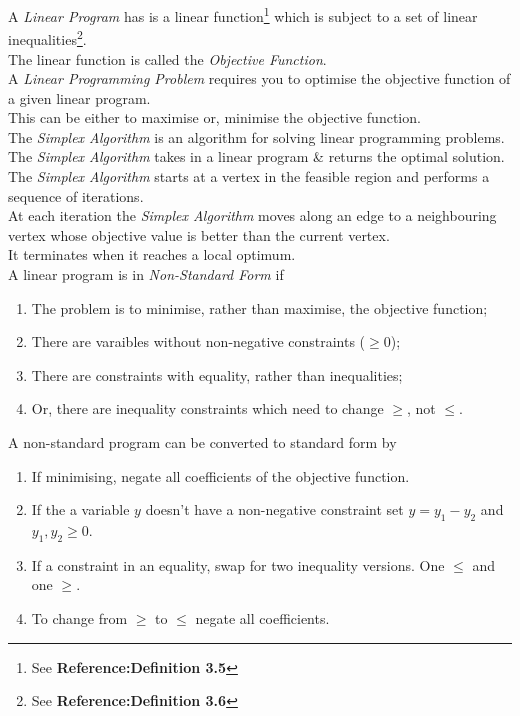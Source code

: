 \documentclass[11pt,a4paper]{article}
\begin{document}
A \textit{Linear Program} has is a linear function\footnote{See \textbf{Reference:Definition 3.5}} which is subject to a set of linear inequalities\footnote{See \textbf{Reference:Definition 3.6}}.\\
\nb The linear function is called the \textit{Objective Function}.\\

A \textit{Linear Programming Problem} requires you to optimise the objective function of a given linear program.\\
This can be either to maximise or, minimise the objective function.\\

The \textit{Simplex Algorithm} is an algorithm for solving linear programming problems.\\
The \textit{Simplex Algorithm} takes in a linear program \& returns the optimal solution.\\
The \textit{Simplex Algorithm} starts at a vertex in the feasible region and performs a sequence of iterations.\\
At each iteration the \textit{Simplex Algorithm} moves along an edge to a neighbouring vertex whose objective value is better than the current vertex.\\
It terminates when it reaches a local optimum.\\

A linear program is in \textit{Non-Standard Form} if
\begin{enumerate}[label=\roman*)]
  \item The problem is to minimise, rather than maximise, the objective function;
  \item There are varaibles without non-negative constraints ($\geq0$);
  \item There are constraints with equality, rather than inequalities;
  \item Or, there are inequality constraints which need to change $\geq$, not $\leq$.
\end{enumerate}

A non-standard program can be converted to standard form by
\begin{enumerate}[label=\roman*)]
  \item If minimising, negate all coefficients of the objective function.
  \item If the a variable $y$ doesn't have a non-negative constraint set $y=y_1-y_2$ and $y_1,y_2\geq0$.
  \item If a constraint in an equality, swap for two inequality versions. One $\leq$ and one $\geq$.
  \item To change from $\geq$ to $\leq$ negate all coefficients.
\end{enumerate}
\end{document}
